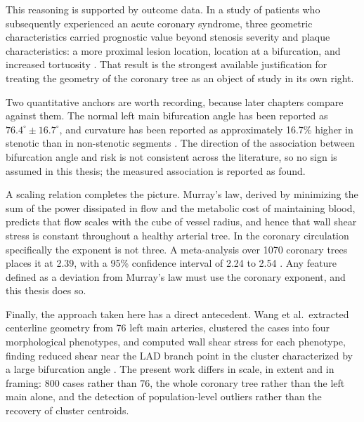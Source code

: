 This reasoning is supported by outcome data.
In a study of patients who subsequently experienced an acute coronary syndrome, three
geometric characteristics carried prognostic value beyond stenosis severity and plaque
characteristics: a more proximal lesion location, location at a bifurcation, and increased
tortuosity \cite{han2022plaque}.
That result is the strongest available justification for treating the geometry of the
coronary tree as an object of study in its own right.

Two quantitative anchors are worth recording, because later chapters compare against them.
The normal left main bifurcation angle has been reported as $76.4^\circ \pm 16.7^\circ$, and
curvature has been reported as approximately 16.7\% higher in stenotic than in non-stenotic
segments \cite{geometry2022plaqueburden}.
The direction of the association between bifurcation angle and risk is not consistent across
the literature, so no sign is assumed in this thesis; the measured association is reported as
found.

A scaling relation completes the picture.
Murray's law, derived by minimizing the sum of the power dissipated in flow and the metabolic
cost of maintaining blood, predicts that flow scales with the cube of vessel radius, and
hence that wall shear stress is constant throughout a healthy arterial tree.
In the coronary circulation specifically the exponent is not three.
A meta-analysis over 1070 coronary trees places it at 2.39, with a 95\% confidence interval
of 2.24 to 2.54 \cite{taylor2024murray}.
Any feature defined as a deviation from Murray's law must use the coronary exponent, and this
thesis does so.

Finally, the approach taken here has a direct antecedent.
Wang et al.\ extracted centerline geometry from 76 left main arteries, clustered the cases
into four morphological phenotypes, and computed wall shear stress for each phenotype,
finding reduced shear near the LAD branch point in the cluster characterized by a large
bifurcation angle \cite{wang2024lmphenotypes}.
The present work differs in scale, in extent and in framing: 800 cases rather than 76, the
whole coronary tree rather than the left main alone, and the detection of population-level
outliers rather than the recovery of cluster centroids.
